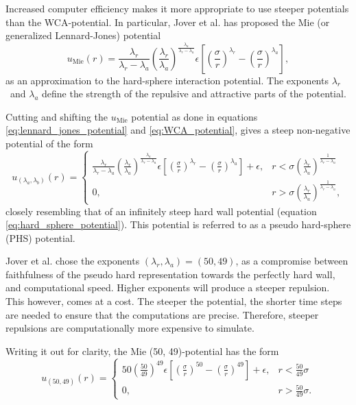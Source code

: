 Increased computer efficiency makes it more appropriate 
to use steeper potentials than the WCA-potential.
In particular, Jover et al. \cite{ref:jover:pseudo_hard} 
has proposed the Mie (or generalized Lennard-Jones) potential
\[
    u_{\text{Mie}}(r) = 
        \frac{\lambda_r}{\lambda_r - \lambda_a}
        \left(\frac{\lambda_r}{\lambda_a}\right)
        ^{\frac{\lambda_a}{\lambda_r - \lambda_a}}
        \epsilon \left[
            \left(\frac{\sigma}{r}\right)^{\lambda_r} -
            \left(\frac{\sigma}{r}\right)^{\lambda_a}
        \right],
\]
as an approximation to the hard-sphere interaction potential.
The exponents $\lambda_r$ and $\lambda_a$ define the strength 
of the repulsive and attractive parts of the potential.

Cutting and shifting the $u_{\text{Mie}}$ potential as done in equations
\eqref{eq:lennard_jones_potential} and \eqref{eq:WCA_potential},
gives a steep non-negative potential of the form
\[
    u_{(\lambda_a, \lambda_b)}(r) = 
    \begin{cases}
        \frac{\lambda_r}{\lambda_r - \lambda_a}
        \left(\frac{\lambda_r}{\lambda_a}\right)
        ^{\frac{\lambda_a}{\lambda_r - \lambda_a}}
        \epsilon \left[
            \left(\frac{\sigma}{r}\right)^{\lambda_r} -
            \left(\frac{\sigma}{r}\right)^{\lambda_a}
        \right]
        + \epsilon,
            & r < \sigma \left(
                \frac{\lambda_r}{\lambda_a}
            \right)^\frac{1}{\lambda_r - \lambda_a} \\
        0,  & r > \sigma \left(
                \frac{\lambda_r}{\lambda_a}
            \right)^\frac{1}{\lambda_r - \lambda_a},
    \end{cases}
\]
closely resembling that of an infinitely steep hard 
wall potential (equation \eqref{eq:hard_sphere_potential}).
This potential is referred to as a pseudo hard-sphere (PHS) potential.

Jover et al. chose the exponents \((\lambda_r, \lambda_a) = (50, 49)\), 
as a compromise between faithfulness of the pseudo hard representation 
towards the perfectly hard wall, and computational speed.
Higher exponents will produce a steeper repulsion. 
This however, comes at a cost. 
The steeper the potential, the shorter time steps are 
needed to ensure that the computations are precise.
Therefore, steeper repulsions are computationally 
more expensive to simulate.

Writing it out for clarity, the Mie (50, 49)-potential has the form
\[
    u_{(50, 49)}(r) = 
    \begin{cases}
        50
        \left(\frac{50}{49}\right)^{49}
        \epsilon \left[
            \left(\frac{\sigma}{r}\right)^{50} -
            \left(\frac{\sigma}{r}\right)^{49}
        \right]
        + \epsilon,
            & r < \frac{50}{49} \sigma\\
        0,  & r > \frac{50}{49} \sigma.
    \end{cases}
\]

